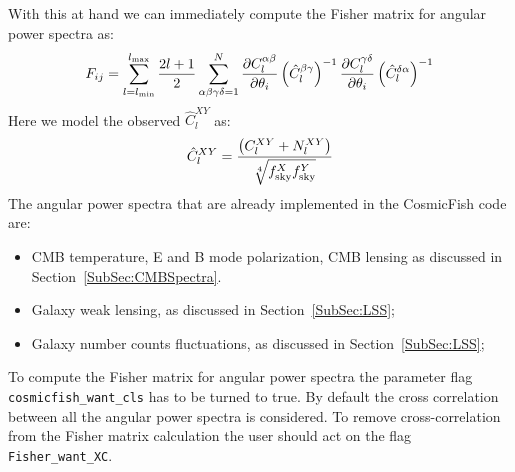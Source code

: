\documentclass[prd,nofootinbib,showpacs]{revtex4}
\newcommand{\code}[1]{\lstinline|#1|}
\begin{document}
%
With this at hand we can immediately compute the Fisher matrix for angular power spectra as:
%
\begin{align}
F_{ij} = \sum_{l=l_{\rm min}}^{l_{\rm max}} \frac{2l+1}{2} \sum_{\alpha \beta \gamma \delta = 1}^{N} \frac{\partial C_l^{\alpha \beta } }{\partial \theta_i} \left(\hat{C}_l^{\beta \gamma}\right)^{-1} \frac{\partial C_l^{\gamma \delta} }{\partial \theta_i} \left(\hat{C}_l^{\delta \alpha}\right)^{-1} 
\end{align}
%
Here we model the observed $\hat{C}_l^{XY}$ as:
%
\begin{align}
\hat{C}_l^{XY} = \frac{\left( C_l^{XY} + N_{l}^{XY} \right)}{ \sqrt[4]{f_{\rm sky}^X f_{\rm sky}^Y}}
\end{align}
%
The angular power spectra that are already implemented in the CosmicFish code are:
%
\begin{itemize}
\item CMB temperature, E and B mode polarization, CMB lensing as discussed in Section~\ref{SubSec:CMBSpectra}.
\item Galaxy weak lensing, as discussed in Section~\ref{SubSec:LSS};
\item Galaxy number counts fluctuations, as discussed in Section~\ref{SubSec:LSS};
\end{itemize}
%
To compute the Fisher matrix for angular power spectra the parameter flag \code{cosmicfish_want_cls} has to be turned to true.
By default the cross correlation between all the angular power spectra is considered. To remove cross-correlation from the Fisher matrix calculation the user should act on the flag \code{Fisher_want_XC}.

%
\end{document}
